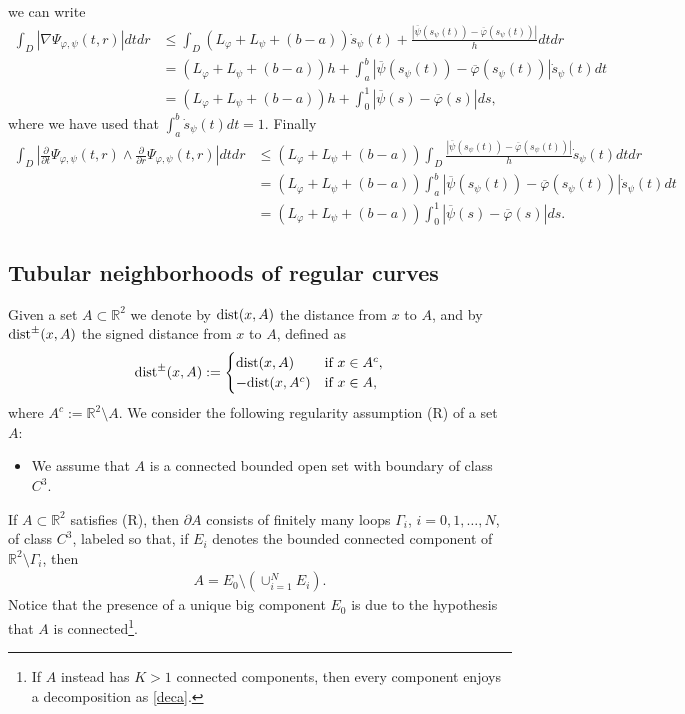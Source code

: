 \documentclass[a4paper,11pt]{article}
\numberwithin{equation}{section}
\newcommand{\R}{\mathbb{R}}
\begin{document}
we can write
\begin{align}\label{stimanablaPsi}
\int_D|\nabla \Psi_{\varphi,\psi}(t,r)|dtdr&\leq \int_D(L_\varphi+L_\psi+(b-a))\dot s_\psi(t)+\frac{|{\overline \psi}(s_\psi(t))-{\overline \varphi}(s_\psi(t))|}{h}dtdr\nonumber\\
&= (L_\varphi+L_\psi+(b-a))h+\int_a^b|{\overline \psi}(s_\psi(t))-{\overline \varphi}(s_\psi(t))|\dot s_\psi(t)dt\nonumber\\
&=(L_\varphi+L_\psi+(b-a))h+\int_0^{1}|{\overline \psi}(s)-{\overline \varphi}(s)|ds,
\end{align}
where we have used that $\int_a^b\dot s_\psi(t)dt=1$.
Finally
\begin{align}\label{stimadetPsi}
	 \nonumber\int_D|\frac{\partial }{\partial t}\Psi_{\varphi,\psi}(t,r)\wedge \frac{\partial }{\partial r}\Psi_{\varphi,\psi}(t,r)|dtdr&\leq(L_\varphi+L_\psi+(b-a))\int_D\frac{|{\overline \psi}(s_\psi(t))-{\overline \varphi}(s_\psi(t))|}{h}\dot s_\psi(t)dtdr\\
	&\nonumber= (L_\varphi+L_\psi+(b-a))\int_a^b|{\overline \psi}(s_\psi(t))-{\overline \varphi}(s_\psi(t))|\dot s_\psi(t)dt\\&=(L_\varphi+L_\psi+(b-a))\int_0^{1}|{\overline \psi}(s)-{\overline \varphi}(s)|ds.
\end{align}

\subsection{Tubular neighborhoods of regular curves}

Given a set $A\subset \R^2$ we denote by $\text{{\rm dist}}(x, A)$ the distance from $x$ to $A$, and by $\text{{\rm dist}}^\pm(x,A)$ the signed distance from $x$ to $A$, defined as 
$$\text{{\rm dist}}^\pm(x,A):=\begin{cases}
	\text{{\rm dist}}(x,A)&\text{if }x\in A^c,\\
	-\text{{\rm dist}}(x,A^c)&\text{if }x\in A,
\end{cases}$$
where $A^c:=\R^2\setminus A$. 
We consider the following regularity assumption (R) of a set $A$:
\begin{itemize}
\item[(R)] We assume that $A$ is a connected bounded open set with boundary of class $C^3$.
\end{itemize}
If $A\subset\R^2$ satisfies (R), then $\partial A$ consists of finitely many loops $\Gamma_i$, $i=0,1,\dots,N$, of class $C^3$, labeled so that, if $E_i$ denotes the bounded connected component of $\R^2\setminus \Gamma_i$, then
\begin{align}\label{deca}
	A=E_0\setminus (\cup_{i=1}^NE_i).
\end{align}
Notice that the presence of a unique big component $E_0$ is due to the hypothesis that $A$ is connected\footnote{If $A$ instead has $K>1$ connected components, then every component enjoys a decomposition as \eqref{deca}.}.
\end{document}
